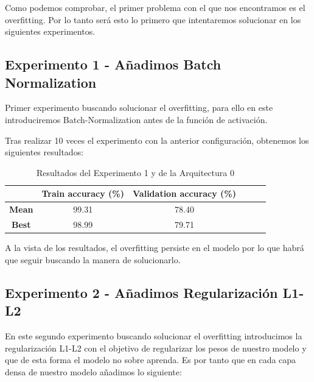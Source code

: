 \documentclass{article}
\begin{document}
		    Como podemos comprobar, el primer problema con el que nos encontramos es el overfitting. Por lo tanto ser\'a esto lo primero que intentaremos solucionar en los siguientes experimentos.

      \subsection{Experimento 1 - A\~{n}adimos Batch Normalization}
		\label{j-s-a0-e1} %
			Primer experimento buscando solucionar el overfitting, para ello en este introduciremos Batch-Normalization antes de la funci\'on de activaci\'on.
			
			
			Tras realizar 10 veces el experimento con la anterior configuraci\'on, obtenemos los siguientes resultados:
			\begin{table}[!h]
				\begin{center}
					\begin{tabular}{ c | c | c | c | c | c |}
						\ & \textbf{Train accuracy (\%)} & \textbf{Validation accuracy (\%)}  \\ \hline
						\textbf{Mean} & 99.31 & 78.40 \\ \hline
						\textbf{Best} & 98.99 & 79.71 \\ \hline
					\end{tabular}
					\caption{Resultados del Experimento 1 y de la Arquitectura 0}
					\label{tab:res-j-a0-e1}
				\end{center}
			\end{table}
		    
		    A la vista de los resultados, el overfitting persiste en el modelo por lo que habr\'a que seguir buscando la manera de solucionarlo.

      \subsection{Experimento 2 - A\~{n}adimos Regularizaci\'on L1-L2}
		\label{j-s-a0-e2} %
			En este segundo experimento buscando solucionar el overfitting introducimos la regularizaci\'on L1-L2 con el objetivo de regularizar los pesos de nuestro modelo y que de esta forma el modelo no sobre aprenda.
            Es por tanto que en cada capa densa de nuestro modelo a\~{n}adimos lo siguiente:
            
\end{document}
